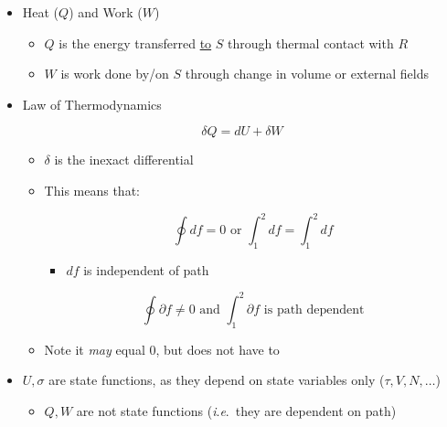 \begin{itemize}

  \item Heat ($Q$) and Work ($W$)

    \begin{itemize}

      \item $Q$ is the energy transferred \underline{to} $S$ through thermal contact with $R$

      \item $W$ is work done by/on $S$ through change in volume or external fields

    \end{itemize}

  \item {} Law of Thermodynamics

    $$\delta Q = dU+ \delta W$$

    \begin{itemize}

      \item $\delta$ is the inexact differential

      \item This means that:

        $$\oint df=0\text{ or }\int_1^2 df=\int_1^2 df$$

        \begin{itemize}

          \item $df$ is independent of path

        \end{itemize}

        $$\oint\partial f\neq0\text{ and }\int_1^2\partial f\text{ is path dependent}$$

      \item Note it \textit{may} equal 0, but does not have to

    \end{itemize}

  \item $U,\sigma$ are state functions, as they depend on state variables only ($\tau,V,N,\ldots$)

    \begin{itemize}

      \item $Q,W$ are not state functions (\textit{i}.\textit{e}.\ they are dependent on path)

    \end{itemize}


\end{itemize}
